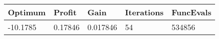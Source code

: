 \begin{tabular}{lllll}
Optimum & Profit & Gain & Iterations & FuncEvals \\ 
\hline 
-10.1785 & 0.17846 & 0.017846 & 54 & 534856 \\ 
\hline 
\end{tabular}